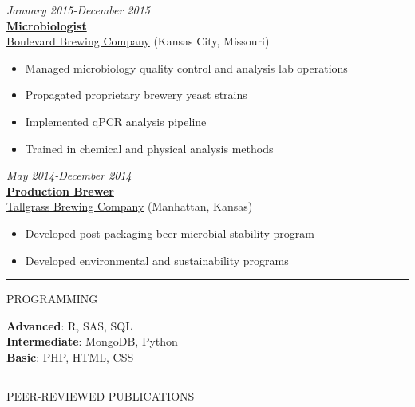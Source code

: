 \documentclass[
]{article}
\begin{document}
\emph{January 2015-December 2015}\\
\href{https://jeremyprovance.github.io/assets/boulevard_brewing.html}{\textbf{Microbiologist}}\\
\href{https://www.boulevard.com}{Boulevard Brewing Company} (Kansas
City, Missouri)

\begin{itemize}
\item
  Managed microbiology quality control and analysis lab operations
\item
  Propagated proprietary brewery yeast strains
\item
  Implemented qPCR analysis pipeline
\item
  Trained in chemical and physical analysis methods
\end{itemize}

\emph{May 2014-December 2014}\\
\href{https://jeremyprovance.github.io/assets/tallgrass_brewing.html}{\textbf{Production
Brewer}}\\
\href{https://en.wikipedia.org/wiki/Tallgrass_Brewing_Company}{Tallgrass
Brewing Company} (Manhattan, Kansas)

\begin{itemize}
\item
  Developed post-packaging beer microbial stability program
\item
  Developed environmental and sustainability programs
\end{itemize}

\begin{center}\rule{0.5\linewidth}{0.5pt}\end{center}

PROGRAMMING

\textbf{Advanced}: R, SAS, SQL\\
\textbf{Intermediate}: MongoDB, Python\\
\textbf{Basic}: PHP, HTML, CSS

\begin{center}\rule{0.5\linewidth}{0.5pt}\end{center}

PEER-REVIEWED PUBLICATIONS
\end{document}
